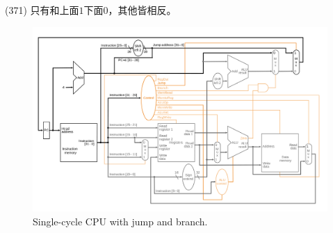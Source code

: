 \item \begin{theorem}{(371)} 只有和上面$1$下面$0$，其他皆相反。
    \begin{figure}[H]
        \centering
        \includegraphics[scale=0.3]{img/single-cycle-cpu.png}
        \caption{Single-cycle CPU with jump and branch.}
        \label{img:single-cycle-cpu}
    \end{figure}
\end{theorem}
